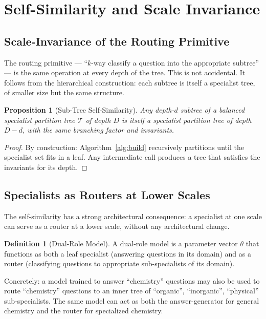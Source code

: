 \documentclass[11pt,twocolumn,a4paper]{article}
\newtheorem{proposition}[theorem]{Proposition}
\theoremstyle{definition}
\newtheorem{definition}[theorem]{Definition}
\theoremstyle{remark}
\newcommand{\Tc}{\mathcal{T}}
\begin{document}
\section{Self-Similarity and Scale Invariance}
\label{sec:self-similar}

\subsection{Scale-Invariance of the Routing Primitive}

The routing primitive --- ``$k$-way classify a question into the appropriate subtree'' --- is the same operation at every depth of the tree. This is not accidental. It follows from the hierarchical construction: each subtree is itself a specialist tree, of smaller size but the same structure.

\begin{proposition}[Sub-Tree Self-Similarity]
\label{prop:selfsim}
Any depth-$d$ subtree of a balanced specialist partition tree $\Tc$ of depth $D$ is itself a specialist partition tree of depth $D - d$, with the same branching factor and invariants.
\end{proposition}

\begin{proof}
By construction: Algorithm~\ref{alg:build} recursively partitions until the specialist set fits in a leaf. Any intermediate call produces a tree that satisfies the invariants for its depth.
\end{proof}

\subsection{Specialists as Routers at Lower Scales}

The self-similarity has a strong architectural consequence: a specialist at one scale can serve as a router at a lower scale, without any architectural change.

\begin{definition}[Dual-Role Model]
A dual-role model is a parameter vector $\theta$ that functions as both a leaf specialist (answering questions in its domain) and as a router (classifying questions to appropriate sub-specialists of its domain).
\end{definition}

Concretely: a model trained to answer ``chemistry'' questions may also be used to route ``chemistry'' questions to an inner tree of ``organic'', ``inorganic'', ``physical'' sub-specialists. The same model can act as both the answer-generator for general chemistry and the router for specialized chemistry.
\end{document}
